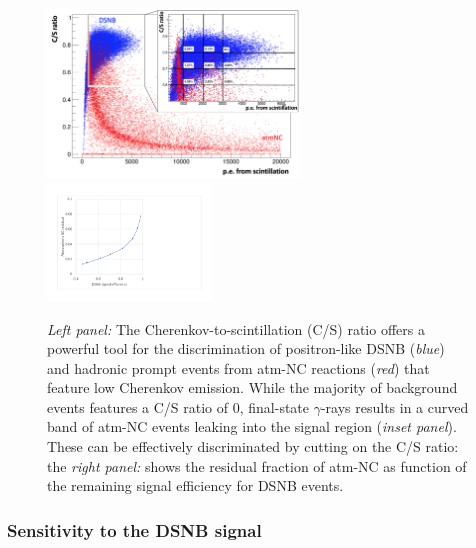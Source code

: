 \begin{figure}[htp!]
\centering
\includegraphics[width=0.6\textwidth]{pics/dsnb_cs_ratio}
\includegraphics[width=0.39\textwidth]{pics/dsnb_cs_efficiencies}
\caption{{\it Left panel:} The Cherenkov-to-scintillation (C/S) ratio offers a powerful tool for the discrimination of positron-like DSNB ({\it blue}) and hadronic prompt events from atm-NC reactions ({\it red}) that feature low Cherenkov emission. While the majority of background events features a C/S ratio of 0, final-state $\gamma$-rays results in a curved band of atm-NC events leaking into the signal region ({\it inset panel}). These can be effectively discriminated by cutting on the C/S ratio: the {\it right panel:} shows the residual fraction of atm-NC as function of the remaining signal efficiency for DSNB events.}
\label{fig:dsnb_csratio}
\end{figure}

\subsubsection{Sensitivity to the DSNB signal} 


